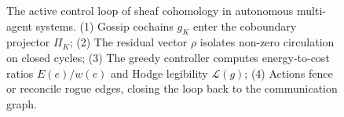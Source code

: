 \begin{figure}[htbp]
\begin{tikzpicture}[
  font=\small,
  block/.style={
    rectangle,
    draw=ptDark,
    fill=white,
    line width=1.1pt,
    inner sep=7pt,
    text width=5.6cm,
    align=center
  }
]
\end{tikzpicture}
\caption{The active control loop of sheaf cohomology in autonomous multi-agent systems. (1) Gossip cochains $g_K$ enter the coboundary projector $\Pi_K$; (2) The residual vector $\rho$ isolates non-zero circulation on closed cycles; (3) The greedy controller computes energy-to-cost ratios $E(e)/w(e)$ and Hodge legibility $\mathcal{L}(g)$; (4) Actions fence or reconcile rogue edges, closing the loop back to the communication graph.}
\label{fig:topological-loop}
\end{figure}
